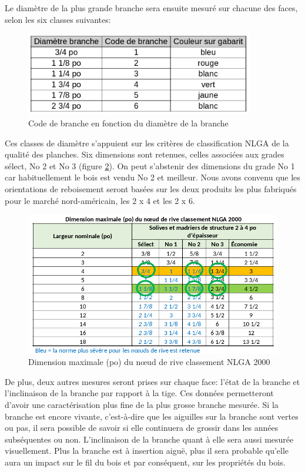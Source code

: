 \documentclass[letterpaper, 12pt]{article}
\begin{document}
\begin{onehalfspace}
\vspace{12pt}

Le diamètre de la plus grande branche sera ensuite mesuré sur chacune des faces, selon les six classes suivantes: 

\begin{figure}[H]
	\centering
	\includegraphics[width=10cm]{Code}
	\caption{Code de branche en fonction du diamètre de la branche}
	\label{code}
\end{figure}

Ces classes de diamètre s’appuient sur les critères de classification NLGA de la qualité des planches. Six dimensions sont retenues, celles associées aux grades sélect, No 2 et No 3 (figure \ref{nlga}). On peut s’abstenir des dimensions du grade No 1 car habituellement le bois est vendu No 2 et meilleur. Nous avons convenu que les orientations de reboisement seront basées sur les deux produits les plus fabriqués pour le marché nord-américain, les 2 x 4 et les 2 x 6. 

\begin{figure}[H]
	\centering
	\includegraphics[width=14cm]{NLGA}
	\caption{Dimension maximale (po) du nœud de rive classement NLGA 2000}
	\label{nlga}
\end{figure}

\vspace{12pt}

De plus, deux autres mesures seront prises sur chaque face: l'état de la branche et l'inclinaison de la branche par rapport à la tige. Ces données permetteront d'avoir une caractérisation plus fine de la plus grosse branche mesurée. Si la branche est encore vivante, c'est-à-dire que les aiguilles sur la branche sont vertes ou pas, il sera possible de savoir si elle continuera de grossir dans les années subséquentes ou non. L'inclinaison de la branche quant à elle sera aussi mesurée visuellement. Plus la branche est à insertion aiguë, plus il sera probable qu'elle aura un impact sur le fil du bois et par conséquent, sur les propriétés du bois.


\end{onehalfspace}
\end{document}
